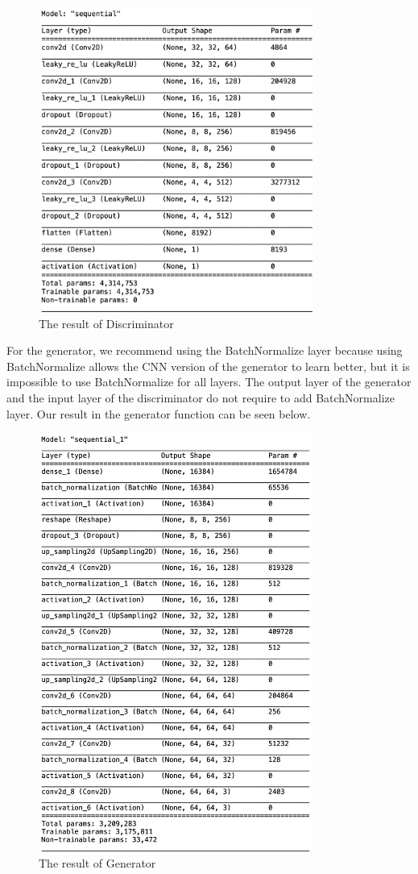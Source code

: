 \documentclass[conference]{IEEEtran}
\begin{document}
   	\begin{figure}[h]
        \caption{The result of Discriminator}
	\includegraphics[width=9cm]{discriminator.png}
	\centering
	\end{figure}
      
   For the generator, we recommend using the BatchNormalize layer because using BatchNormalize allows the CNN version of the generator to learn better, but it is impossible to use BatchNormalize for all layers. The output layer of the generator and the input layer of the discriminator do not require to add BatchNormalize layer. Our result in the generator function can be seen below.
   	
	\begin{figure}[h]
	\caption{The result of Generator}
	\includegraphics[width=9cm]{generator.png}
         \end{figure}
         
\end{document}
